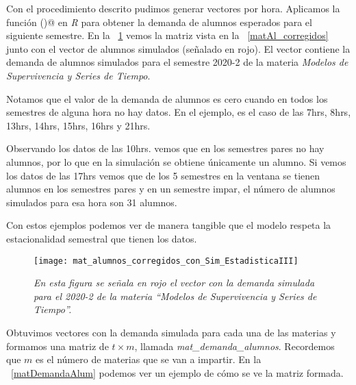 Con el procedimiento descrito pudimos generar vectores por hora. Aplicamos la función \verb@hw()@ en \textit{R} para obtener la demanda de alumnos esperados para el siguiente semestre. En la \figurename{~\ref{matAl_corregidos_y_sim}} vemos la matriz vista en la \figurename{~\ref{matAl_corregidos}} junto con el vector de alumnos simulados (señalado en rojo). El vector contiene la demanda de alumnos simulados para el semestre 2020-2 de la materia \textit{Modelos de Supervivencia y Series de Tiempo}.

Notamos que el valor de la demanda de alumnos es cero cuando en todos los semestres de alguna hora no hay datos. En el ejemplo, es el caso de las 7hrs, 8hrs, 13hrs, 14hrs, 15hrs, 16hrs y 21hrs.

Observando los datos de las 10hrs. vemos que en los semestres pares no hay alumnos, por lo que en la simulación se obtiene únicamente un alumno. Si vemos los datos de las 17hrs vemos que de los 5 semestres en la ventana se tienen alumnos en los semestres pares y en un semestre impar, el número de alumnos simulados para esa hora son 31 alumnos.

Con estos ejemplos podemos ver de manera tangible que el modelo respeta la estacionalidad semestral que tienen los datos.

\begin{figure}[H]
\centering
\texttt{[image: mat\_alumnos\_corregidos\_con\_Sim\_EstadisticaIII]} %
\caption[\textit{Ejemplo de vector con demanda simulada para el 2020-2 de ``Modelos de Supervivencia y Series de Tiempo''}]{\textit{En esta figura se señala en rojo el vector con la demanda simulada para el 2020-2 de la materia ``Modelos de Supervivencia y Series de Tiempo''.}}\label{matAl_corregidos_y_sim}
\end{figure}


Obtuvimos vectores con la demanda simulada para cada una de las materias y formamos una matriz de $t \times m$, llamada \textit{mat\_demanda\_alumnos}. Recordemos que $m$ es el número de materias que se van a impartir. En la \figurename{~\ref{matDemandaAlum}} podemos ver un ejemplo de cómo se ve la matriz formada.

